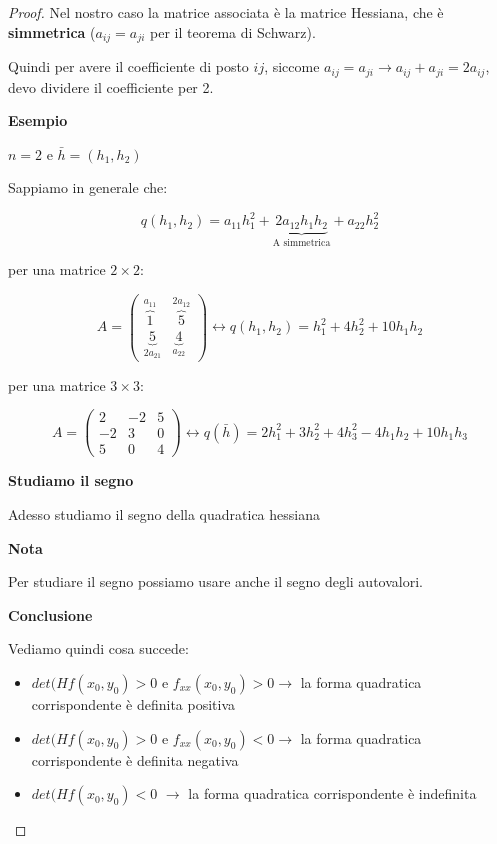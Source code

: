 \documentclass[11pt]{article}
\begin{document}
\begin{proof}
       Nel nostro caso la matrice associata è la matrice Hessiana, che è \textbf{simmetrica} ($a_{ij} = a_{ji}$ per il teorema di Schwarz).

       Quindi per avere il coefficiente di posto $ij$, siccome $a_{ij} = a_{ji} \rightarrow a_{ij} + a_{ji} = 2a_{ij}$, devo dividere il coefficiente per 2.


\textbf{Esempio} 

$n=2$ e $\bar{h} =(h_1,h_2)$

Sappiamo in generale che:

\[
    q(h_1,h_2) = a_{11} h_1^{2} + \underbrace{2a_{12} h_1 h_2}_\text{A simmetrica} + a_{22}h_2^{2}
\]

per una matrice $2\times 2$:

\[
    A= \begin{pmatrix}
        \overbrace{1}^\text{$a_{11}$} & \overbrace{5}^\text{$2a_{12}$}\\
        \underbrace{5}_\text{$2a_{21}$} & \underbrace{4}_\text{$a_{22}$}
    \end{pmatrix} \leftrightarrow 
    q(h_1,h_2) = h_1^{2}+4 h_2^{2}+ 10 h_1 h_2
\]

per una matrice $3\times 3$:

\[
    A = \begin{pmatrix}
    2 & -2 & 5\\
    -2 & 3 & 0\\
    5 & 0 & 4
    \end{pmatrix} \leftrightarrow
    q(\bar{h} ) = 2 h_1^{2}+3 h_2^{2}+ 4 h_3^{2} - 4 h_1 h_2 + 10 h_1 h_3
\]

\newpage

\textbf{Studiamo il segno} 

Adesso studiamo il segno della quadratica hessiana




\textbf{Nota} 

Per studiare il segno possiamo usare anche il segno degli autovalori.

\textbf{Conclusione} 

Vediamo quindi cosa succede:

\begin{itemize}
    \item $det(Hf(x_0,y_0)>0$ e $f_{xx}(x_0,y_0)>0 \rightarrow $ la forma quadratica corrispondente è definita positiva
    \item $det(Hf(x_0,y_0)>0$ e $f_{xx}(x_0,y_0)<0 \rightarrow $ la forma quadratica corrispondente è definita negativa
    \item $det(Hf(x_0,y_0)<0$ $\rightarrow $ la forma quadratica corrispondente è indefinita
\end{itemize}

\end{proof}
\end{document}
